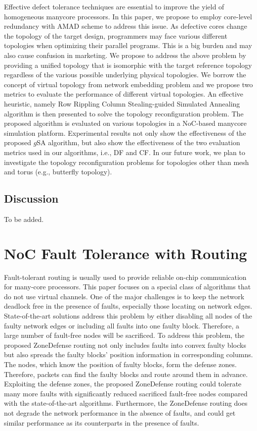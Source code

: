 Effective defect tolerance techniques are essential to improve the yield of homogeneous manycore processors. In this paper, we propose to employ core-level redundancy with AMAD scheme to address this issue. As defective cores change the topology of the target design, programmers may face various different topologies when optimizing their parallel programs. This is a big burden and may also cause confusion in marketing. We propose to address the above problem by providing a unified topology that is isomorphic with the target reference topology regardless of the various possible underlying physical topologies. We borrow the concept of virtual topology from network embedding problem and we propose two metrics to evaluate the performance of different virtual topologies. An effective heuristic, namely Row Rippling Column Stealing-guided Simulated Annealing algorithm is then presented to solve the topology reconfiguration problem. The proposed algorithm is evaluated on various topologies in a NoC-based manycore simulation platform. Experimental results not only show the effectiveness of the proposed $g$SA algorithm, but also show the effectiveness of the two evaluation metrics used in our algorithms, i.e., DF and CF. In our future work, we plan to investigate the topology reconfiguration problems for topologies other than mesh and torus (e.g., butterfly topology).

\subsection{Discussion}
To be added.

\section{NoC Fault Tolerance with Routing}
Fault-tolerant routing is usually used to provide reliable on-chip communication for many-core processors. This paper focuses on a special class of algorithms that do not use virtual channels. One of the major challenges is to keep the network deadlock free in the presence of faults, especially those locating on network edges. State-of-the-art solutions address this problem by either disabling all nodes of the faulty network edges or including all faults into one faulty block. Therefore, a large number of fault-free nodes will be sacrificed. To address this problem, the proposed ZoneDefense routing not only includes faults into convex faulty blocks but also spreads the faulty blocks’ position information in corresponding columns. The nodes, which know the position of faulty blocks, form the defense zones. Therefore, packets can find the faulty blocks and route around them in advance. Exploiting the defense zones, the proposed ZoneDefense routing could tolerate many more faults with significantly reduced sacrificed fault-free nodes compared with the state-of-the-art algorithms. Furthermore, the ZoneDefense routing does not degrade the network performance in the absence of faults, and could get similar performance as its counterparts in the presence of faults.

